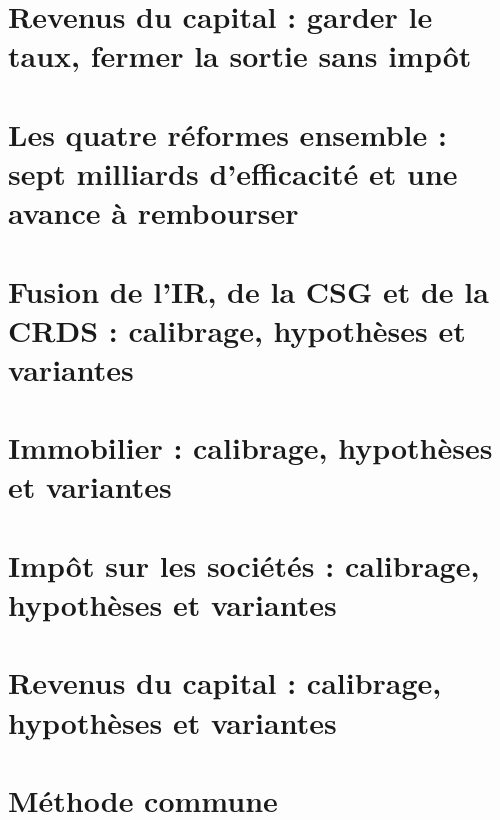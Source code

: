 \documentclass[11pt,a4paper]{article}
\begin{document}
\section{Revenus du capital : garder le taux, fermer la sortie sans impôt}\label{sec:pfu}


\section{Les quatre réformes ensemble : sept milliards d'efficacité et une avance à rembourser}\label{sec:ensemble}


\clearpage
\appendix
\renewcommand{\thesection}{Annexe \Alph{section}}
\section{Fusion de l'IR, de la CSG et de la CRDS : calibrage, hypothèses et variantes}\label{ann:ircsg}
\section{Immobilier : calibrage, hypothèses et variantes}\label{ann:foncier}
\section{Impôt sur les sociétés : calibrage, hypothèses et variantes}\label{ann:is}
\section{Revenus du capital : calibrage, hypothèses et variantes}\label{ann:pfu}
\section{Méthode commune}\label{ann:methode}


\end{document}
